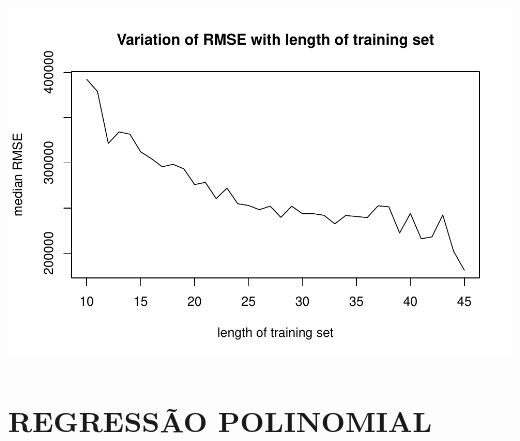\documentclass[a4paper, 12pt]{article}
\begin{document}
\includegraphics{Artigo_files/figure-latex/unnamed-chunk-6-1.pdf}

\section{REGRESSÃO POLINOMIAL}\label{regressao-polinomial}
\end{document}
